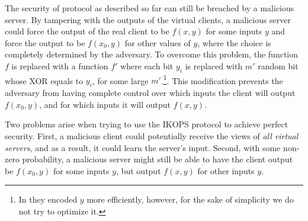 \documentclass{llncs}
\newcommand{\OT}{\operatorname{OT}}
\newcommand{\bOT}[2]{\binom{#2}{#1}\text{-bit-OT}}
\newcommand{\sOT}[3]{\binom{#2}{#1}\text{-}#3\text{-string-OT}}
\renewcommand{\v}{\myvec{v}}
\begin{document}
The security of protocol as described so far can still be breached by a malicious server. By tampering with the outputs of the virtual clients, a malicious server could force the output of the real client to be $f(x,y)$ for some inputs $y$ and force the output to be $f(x_0,y)$ for other values of $y$, where the choice is completely determined by the adversary. To overcome this problem, the function $f$ is replaced with a function $f'$ where each bit $y_i$ is replaced with $m'$ random bit whose XOR equals to $y_i$, for some large $m'$.\footnote{In \cite{IKOPS11} they encoded $y$ more efficiently, however, for the sake of simplicity we do not try to optimize it.}. This modification prevents the adversary from having complete control over which inputs the client will output $f(x_0,y)$, and for which inputs it will output $f(x,y)$.

Two problems arise when trying to use the IKOPS protocol to achieve perfect security. First, a malicious client could potentially receive the views of \emph{all virtual servers}, and as a result, it could learn the server's input. Second, with some non-zero probability, a malicious server might still be able to have the client output be $f(x_0,y)$ for some inputs $y$, but output $f(x,y)$ for other inputs $y$.
\end{document}
